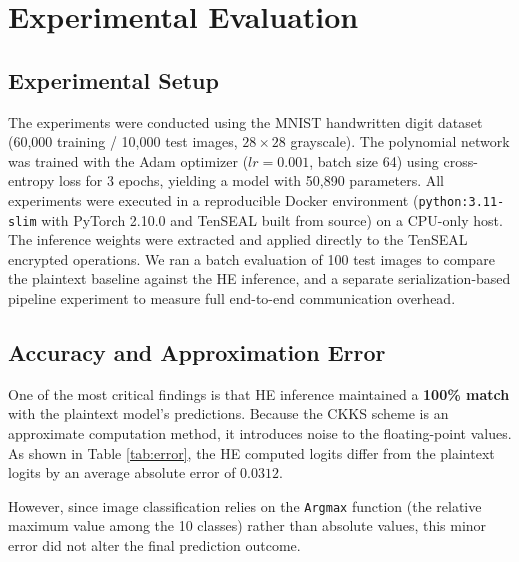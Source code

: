 \documentclass[runningheads]{llncs}
\begin{document}
\section{Experimental Evaluation}

\subsection{Experimental Setup}
The experiments were conducted using the MNIST handwritten digit dataset (60,000 training / 10,000 test images, $28\times28$ grayscale). The polynomial network was trained with the Adam optimizer ($lr=0.001$, batch size 64) using cross-entropy loss for 3 epochs, yielding a model with 50,890 parameters. All experiments were executed in a reproducible Docker environment (\texttt{python:3.11-slim} with PyTorch 2.10.0 and TenSEAL built from source) on a CPU-only host. The inference weights were extracted and applied directly to the TenSEAL encrypted operations. We ran a batch evaluation of 100 test images to compare the plaintext baseline against the HE inference, and a separate serialization-based pipeline experiment to measure full end-to-end communication overhead.

\subsection{Accuracy and Approximation Error}
One of the most critical findings is that HE inference maintained a \textbf{100\% match} with the plaintext model's predictions. Because the CKKS scheme is an approximate computation method, it introduces noise to the floating-point values. As shown in Table \ref{tab:error}, the HE computed logits differ from the plaintext logits by an average absolute error of $0.0312$. 

However, since image classification relies on the \texttt{Argmax} function (the relative maximum value among the 10 classes) rather than absolute values, this minor error did not alter the final prediction outcome.
\end{document}
